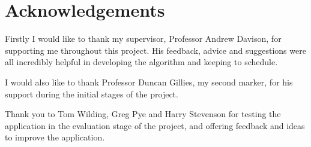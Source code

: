 \section{Acknowledgements}

Firstly I would like to thank my supervisor, Professor Andrew Davison, for supporting me throughout this project. His feedback, advice and suggestions were all incredibly helpful in developing the algorithm and keeping to schedule.

I would also like to thank Professor Duncan Gillies, my second marker, for his support during the initial stages of the project.

Thank you to Tom Wilding, Greg Pye and Harry Stevenson for testing the application in the evaluation stage of the project, and offering feedback and ideas to improve the application.